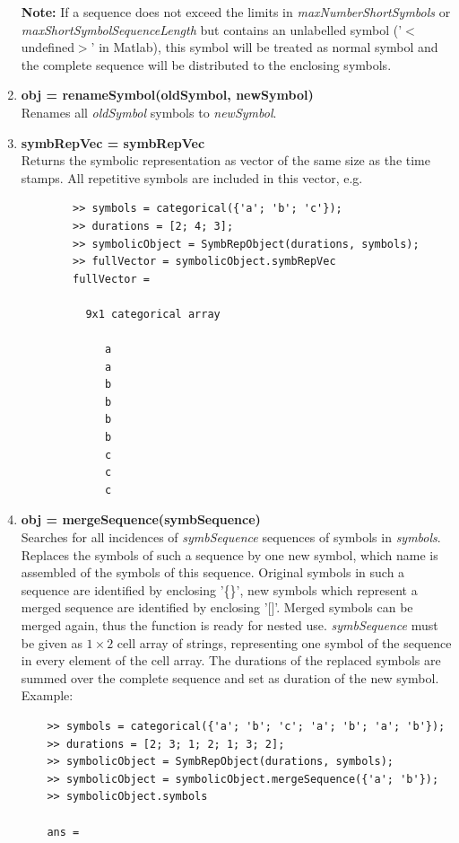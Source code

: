 \documentclass[a4]{scrreprt}
\begin{document}
\begin{enumerate}
			\textbf{Note:} If a sequence does not exceed the limits in \textit{maxNumberShortSymbols} or \textit{maxShortSymbolSequenceLength} but contains an unlabelled symbol ('$<$undefined$>$' in Matlab), this symbol will be treated as normal symbol and the complete sequence will be distributed to the enclosing symbols.
	
	\item \textbf{obj = renameSymbol(oldSymbol, newSymbol)}\\
		Renames all \textit{oldSymbol} symbols to \textit{newSymbol}.
	
	
	\item \textbf{symbRepVec = symbRepVec}\\
		Returns the symbolic representation as vector of the same size as the time stamps. All repetitive symbols are included in this vector, e.g.	
		\begin{verbatim}
		>> symbols = categorical({'a'; 'b'; 'c'});
		>> durations = [2; 4; 3];
		>> symbolicObject = SymbRepObject(durations, symbols);
		>> fullVector = symbolicObject.symbRepVec
		fullVector = 
		
		  9x1 categorical array
		
		     a 
		     a 
		     b 
		     b 
		     b 
		     b 
		     c 
		     c 
		     c 
		\end{verbatim}		
	\item \textbf{obj = mergeSequence(symbSequence)}\\
	Searches for all incidences of \textit{symbSequence} sequences of symbols in \textit{symbols}. Replaces the symbols of such a sequence by one new symbol, which name is assembled of the symbols of this sequence. Original symbols in such a sequence are identified by enclosing '\{\}', new symbols which represent a merged sequence are identified by enclosing '[]'. Merged symbols can be merged again, thus the function is ready for nested use. \textit{symbSequence} must be given as $1 \times 2$ cell array of strings, representing one symbol of the sequence in every element of the cell array. The durations of the replaced symbols are summed over the complete sequence and set as duration of the new symbol.
	Example:
	\begin{verbatim}
	>> symbols = categorical({'a'; 'b'; 'c'; 'a'; 'b'; 'a'; 'b'});
	>> durations = [2; 3; 1; 2; 1; 3; 2];
	>> symbolicObject = SymbRepObject(durations, symbols);
	>> symbolicObject = symbolicObject.mergeSequence({'a'; 'b'});
	>> symbolicObject.symbols
	
	ans = 
	

\end{verbatim}
\end{enumerate}
\end{document}
